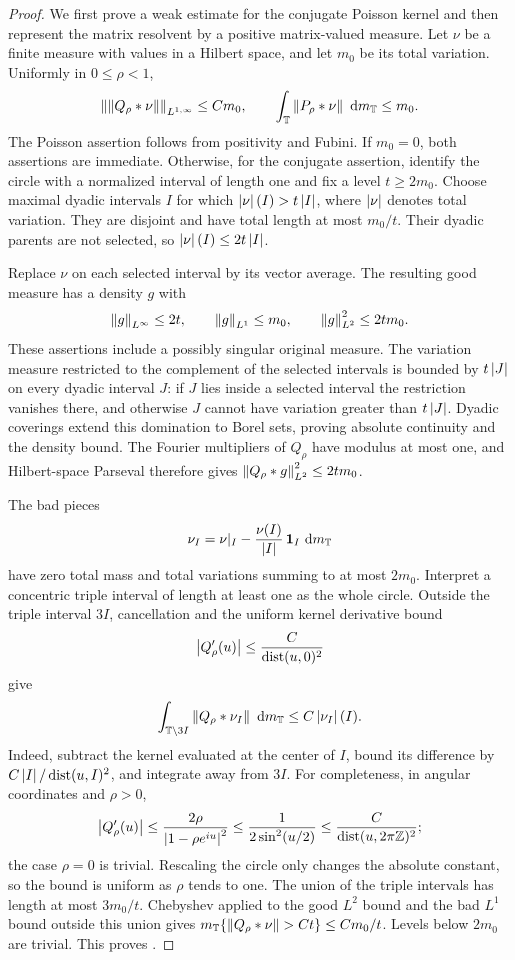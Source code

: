 \begin{proof}
We first prove a weak estimate for the conjugate Poisson kernel and then
represent the matrix resolvent by a positive matrix-valued measure.
Let $\nu$ be a finite measure with values in a Hilbert space,
and let $m_0$ be its total variation. Uniformly in $0\le\rho<1$,
\begin{equation}
 \left\lVert\left\lVert Q_\rho*\nu\right\rVert\right\rVert_{L^{1,\infty}}\le C m_0,
 \qquad
 \int_\mathbb T\left\lVert P_\rho*\nu\right\rVert\,\,\mathrm d m_\mathbb T\le m_0.
 \label{mat:hilbert-kernel}
\end{equation}
The Poisson assertion follows from positivity and Fubini. If $m_0=0$,
both assertions are immediate. Otherwise, for the conjugate assertion,
identify the circle with a normalized interval of length one and fix a
level $t\ge2m_0$. Choose maximal dyadic intervals
$I$ for which $\left\lvert\nu\right\rvert(I)>t\left\lvert I\right\rvert$, where $\left\lvert\nu\right\rvert$ denotes total
variation. They are disjoint and have total length at most $m_0/t$.
Their dyadic parents are not selected, so
$\left\lvert\nu\right\rvert(I)\le2t\left\lvert I\right\rvert$.

Replace $\nu$ on each selected interval by its vector average. The
resulting good measure has a density $g$ with
\[
 \left\lVert g\right\rVert_{L^\infty}\le2t,\qquad
 \left\lVert g\right\rVert_{L^1}\le m_0,\qquad
 \left\lVert g\right\rVert_{L^2}^2\le2tm_0.
\]
These assertions include a possibly singular original measure. The
variation measure restricted to the complement of the selected
intervals is bounded by $t\left\lvert J\right\rvert$ on every dyadic interval $J$: if $J$
lies inside a selected interval the restriction vanishes there, and
otherwise $J$ cannot have variation greater than $t\left\lvert J\right\rvert$. Dyadic
coverings extend this domination to Borel sets, proving absolute
continuity and the density bound. The Fourier multipliers of $Q_\rho$
have modulus at most one,
and Hilbert-space Parseval therefore gives
$\left\lVert Q_\rho*g\right\rVert_{L^2}^2\le2tm_0$.

The bad pieces
\[
 \nu_I=\nu|_I-\frac{\nu(I)}{\left\lvert I\right\rvert}\,\mathbf 1_I\,\,\mathrm d m_\mathbb T
\]
have zero total mass and total variations summing to at most $2m_0$.
Interpret a concentric triple interval of length at least one as the
whole circle. Outside the triple interval $3I$, cancellation and the
uniform kernel derivative bound
\[
 \left\lvert Q_\rho'(u)\right\rvert\le\frac C{\operatorname{dist}(u,0)^2}
\]
give
\[
 \int_{\mathbb T\setminus3I}\left\lVert Q_\rho*\nu_I\right\rVert\,\,\mathrm d m_\mathbb T
       \le C\left\lvert\nu_I\right\rvert(I).
\]
Indeed, subtract the kernel evaluated at the center of $I$, bound its
difference by $C\left\lvert I\right\rvert/\operatorname{dist}(u,I)^2$, and integrate away from $3I$.
For completeness, in angular coordinates and $\rho>0$,
\[
 \left\lvert Q_\rho'(u)\right\rvert
 \le\frac{2\rho}{\left\lvert1-\rho e^{iu}\right\rvert^2}
 \le\frac1{2\sin^2(u/2)}
 \le\frac C{\operatorname{dist}(u,2\pi\mathbb Z)^2};
\]
the case $\rho=0$ is trivial. Rescaling the circle only changes the
absolute constant, so the bound is uniform as $\rho$ tends to one. The union
of the triple intervals has length at most $3m_0/t$. Chebyshev applied
to the good $L^2$ bound and the bad $L^1$ bound outside this union gives
$m_\mathbb T\{\left\lVert Q_\rho*\nu\right\rVert>Ct\}\le Cm_0/t$. Levels below $2m_0$ are
trivial. This proves .


\end{proof}
